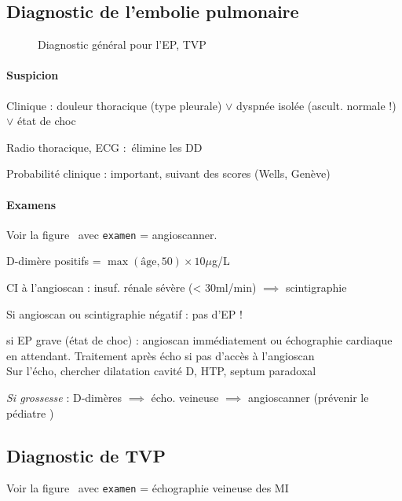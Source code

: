 \documentclass{article}
\newcommand*{\TakeFourierOrnament}[1]{{%
\fontencoding{U}\fontfamily{futs}\selectfont\char#1}}
\newcommand*{\danger}{\TakeFourierOrnament{66}}
\begin{document}
\subsection{Diagnostic de l'embolie pulmonaire}
\begin{figure}[htpb]
  \label{fig:ep-diag}
  \centering
  \caption{Diagnostic général pour l'EP, TVP}
\end{figure}


\paragraph{Suspicion}
Clinique : douleur thoracique (type pleurale) $\vee$ dyspnée isolée (ascult.
normale !) $\vee$ état de choc

Radio thoracique, ECG : élimine les DD

Probabilité clinique : important, suivant des scores (Wells, Genève)

\paragraph{Examens}
Voir la figure~ avec \texttt{examen} = angioscanner.

D-dimère positifs = $\max(\text{âge}, 50) \times 10 \mu{}$g/L

CI à l'angioscan : insuf. rénale sévère (< 30ml/min) $\implies$ scintigraphie

Si angioscan ou scintigraphie négatif : pas d'EP !

\danger{} si EP grave (état de choc) : angioscan immédiatement ou échographie
cardiaque en attendant. Traitement après écho si pas d'accès à l'angioscan
\skull\\
Sur l'écho, chercher dilatation cavité D, HTP, septum paradoxal

\textit{Si grossesse}  : D-dimères $\implies$ écho. veineuse $\implies$ angioscanner
(prévenir le pédiatre \skull)

\subsection{Diagnostic de TVP}
Voir la figure~ avec \texttt{examen} = échographie veineuse
des MI
\end{document}
